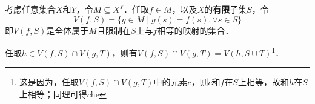 考虑任意集合$X$和$Y$，令$M\subseteq X^Y$．任取$f\in M$，以及$X$的\textbf{有限}子集$S$，令
\begin{equation}
V(f, S) = \{g\in M\mid g(s)=f(s), \forall s\in S\}
\end{equation}
即$V(f, S)$是全体属于$M$且限制在$S$上与$f$相等的映射的集合．

任取$h\in V(f, S)\cap V(g, T)$，则有$V(f, S)\cap V(g, T) = V(h, S\cup T)$\footnote{这是因为，任取$V(f, S)\cap V(g, T)$中的元素$c$，则$c$和$f$在$S$上相等，故和$h$在$S$上相等；同理可得$c$he}．







































